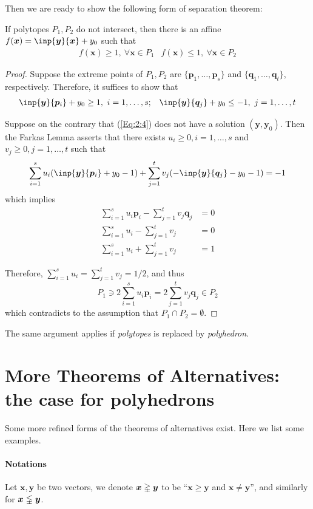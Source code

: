 Then we are ready to show the following form of separation theorem:

\begin{theorem}
If polytopes $P_1,P_2$ do not intersect, then there is an affine $f(\bm x)=\inp{\bm y}{\bm x}+y_0$ such that 
\[
\begin{array}{ll}
f(\bm x)\ge1,\ \forall \bm x\in P_1
&
f(\bm x)\le 1,\ \forall \bm x \in P_2
\end{array}
\]
\end{theorem}
\begin{proof}
Suppose the extreme points of $P_1,P_2$ are $\{\bm p_1,\dots,\bm p_s\}$ and $\{\bm q_1,\dots,\bm q_t\}$, respectively. Therefore, it suffices to show that
\begin{equation}\label{Eq:2:4}
\begin{array}{ll}
\inp{\bm y}{\bm p_i}+y_0\ge1, \ i=1,\dots,s;
&
\inp{\bm y}{\bm q_j}+y_0\le-1,\ j=1,\dots,t
\end{array}
\end{equation}

Suppose on the contrary that (\ref{Eq:2:4}) does not have a solution $(\bm y,\bm y_0)$.
Then the Farkas Lemma asserts that there exists $u_i\ge0, i=1,\dots,s$ and $v_j\ge0, j=1,\dots,t$ such that
\[
\sum_{i=1}^su_i(\inp{\bm y}{\bm p_i} + y_0 - 1)
+
\sum_{j=1}^tv_j(-\inp{\bm y}{\bm q_j} - y_0 - 1)
=-1
\]
which implies
\begin{align*}
\sum_{i=1}^su_i\bm p_i - \sum_{j=1}^tv_j\bm q_j&=0\\
\sum_{i=1}^su_i - \sum_{j=1}^tv_j &= 0\\
\sum_{i=1}^su_i + \sum_{j=1}^tv_j&=1
\end{align*}

Therefore, $\sum_{i=1}^su_i = \sum_{j=1}^tv_j = 1/2$, and thus
\[
P_1\ni
2\sum_{i=1}^su_i\bm p_i
=
2\sum_{j=1}^tv_j\bm q_j
\in P_2
\]
which contradicts to the assumption that $P_1\cap P_2=\emptyset$.
\end{proof}
The same argument applies if \emph{polytopes} is replaced by \emph{polyhedron}.

\section{More Theorems of Alternatives: the case for polyhedrons}
Some more refined forms of the theorems of alternatives exist. Here we list some examples.

\paragraph{Notations}
Let $\bm x,\bm y$ be two vectors, we denote $\bm x\gvertneqq\bm y$ to be ``$\bm x\ge\bm y$ and $\bm x\ne\bm y$'', and similarly for $\bm x\lvertneqq\bm y$.

